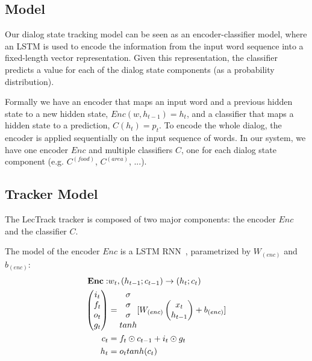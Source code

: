 \documentclass[11pt,twocolumn]{article}
\begin{document}
\subsection{Model}
Our dialog state tracking model can be seen as an encoder-classifier model, where an LSTM is used to encode the information from the input word sequence into a fixed-length vector representation. Given this representation, the classifier predicts a value for each of the dialog state components (as a probability distribution).

Formally we have an encoder that maps an input word and a previous hidden state to a new hidden state, $Enc(w, h_{t-1})=h_t$, and a classifier that maps a hidden state to a prediction, $C(h_t)=p_t$. To encode the whole dialog, the encoder is applied sequentially on the input sequence of words. In our system, we have one encoder $Enc$ and multiple classifiers $C$, one for each dialog state component (e.g. $C^{(food)}$, $C^{(area)}$, ...).


\subsection{Tracker Model}
The LecTrack tracker is composed of two major components: the encoder $Enc$ and the classifier $C$.

The model of the encoder $Enc$ is a LSTM RNN~\cite{hochreiter1997long,zaremba2014recurrent}, parametrized by $W_{(enc)}$ and $b_{(enc)}$:
\begin{align*}
\bf{Enc}: & w_t, (h_{t-1}; c_{t-1}) \rightarrow  (h_t; c_t) \\
\begin{pmatrix}
i_t \\
f_t \\
o_t \\
g_t
\end{pmatrix} &=
\begin{matrix}
\sigma \\
\sigma \\
\sigma \\
tanh
\end{matrix}
[
W_{(enc)}
\begin{pmatrix}
x_t \\
h_{t-1}
\end{pmatrix}
+
b_{(enc)}
] \\
c_t &= f_t \odot c_{t-1} + i_t \odot g_t \\
h_t &= o_t tanh(c_t)
\end{align*}
\end{document}
